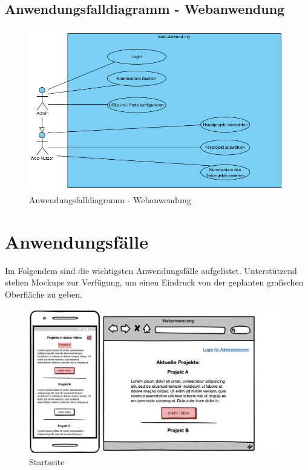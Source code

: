 \newpage

\newpage

\newpage

\subsection{Anwendungsfalldiagramm - Webanwendung}

\begin{figure}[h]
	\centering
	\includegraphics[width=\textwidth]{img/usecaseweb.png}	
	\caption{Anwendungsfalldiagramm - Webanwendung}
	\label{fig:anwendungsfalldiagramm-server}
\end{figure}

\newpage

\section{Anwendungsfälle}
Im Folgendem sind die wichtigsten Anwendungsfälle aufgelistet. Unterstützend stehen Mockups zur Verfügung, um einen Eindruck von der geplanten grafischen Oberfläche zu geben.
\begin{figure}[h]
	\centering
	\includegraphics[width=\textwidth]{img/MUstart.png}			
	\caption{Startseite}
	\label{fig:anwendungsfalldiagramm-app}
\end{figure}

